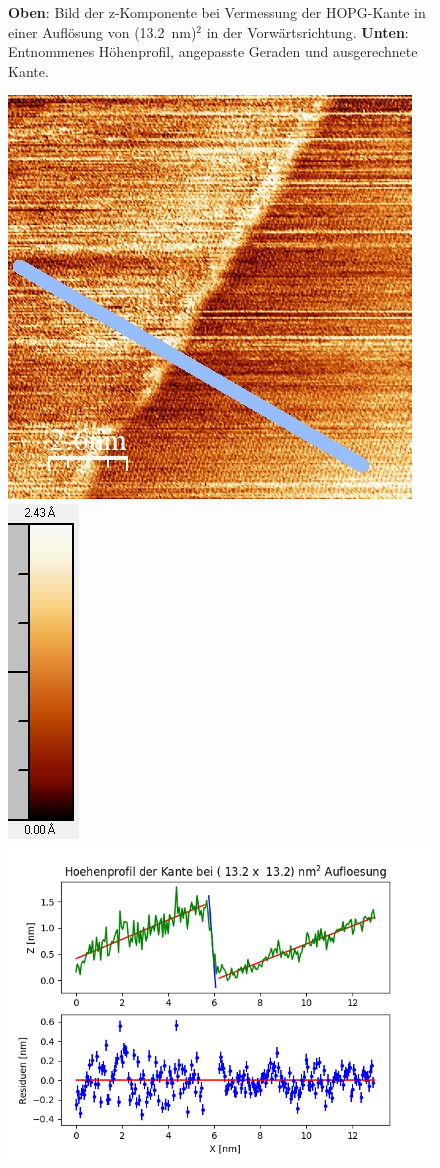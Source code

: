 \documentclass[12pt,a4paper]{article}
\begin{document}
\begin{figure}
\caption{\textbf{Oben}: Bild der z-Komponente bei Vermessung der HOPG-Kante in einer Auflösung von (\SI{13,2}{nm})$^2$ in der Vorwärtsrichtung. \textbf{Unten}: Entnommenes Höhenprofil, angepasste Geraden und ausgerechnete Kante.}
\end{figure}

\begin{figure}
\centering
\includegraphics[scale=0.6]{Bilder/Anhang/Kante/0132_Kante_nach.jpg}
\includegraphics[scale=0.6]{Bilder/Anhang/Kante/0132_Kante_nach_Skala.jpg}
\includegraphics[scale=0.6]{Bilder/Anhang/Kante/Profil_Kante_0132_rueck.png}

\end{figure}
\end{document}

